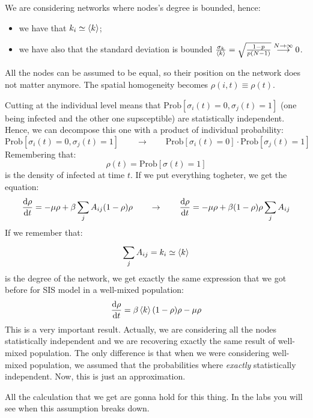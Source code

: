 \documentclass[../main/main.tex]{subfiles}
\begin{document}
We are considering networks where nodes's degree is bounded, hence:
\begin{itemize}
\item we have that \( k_i \simeq \expval{k}  \);
\item we have also that the standard deviation is bounded \( \frac{\sigma _k}{\expval{k} } = \sqrt{ \frac{1-p}{p(N-1)} } \overset{N \rightarrow \infty }{\longrightarrow} 0\).
\end{itemize}
All the nodes can be assumed to be equal, so their position on the network does not matter anymore. The spatial homogeneity becomes \( \rho (i,t) \equiv \rho (t) \).

Cutting at the individual level means that \( \text{Prob} [\sigma _i (t) = 0, \sigma _j (t ) =1 ] \) (one being infected and the other one supsceptible) are statistically independent. Hence, we can decompose this one with a product of individual probability:
\begin{equation*}
  \text{Prob} [\sigma _i (t) = 0, \sigma _j (t ) =1 ] \qquad \rightarrow \qquad \text{Prob} [\sigma _i (t) = 0] \cdot \text{Prob} [\sigma _j (t ) =1 ]
\end{equation*}
Remembering that:
\begin{equation*}
  \rho (t) = \text{Prob} [\sigma (t)=1]
\end{equation*}
is the density of infected at time \( t \).
If we put everything togheter, we get the equation:
\begin{equation*}
  \dv{\rho }{t} = - \mu \rho  + \beta \sum_{j}^{} A_{ij} (1- \rho ) \rho \qquad \rightarrow \qquad
   \dv{\rho }{t} = - \mu \rho  + \beta (1- \rho ) \rho \sum_{j}^{} A_{ij}
\end{equation*}
If we remember that:
\begin{equation}
  \sum_{j}^{} A_{ij} = k_i \simeq \expval{k}
\end{equation}
is the degree of the network, we get exactly the same expression that we got before for SIS model in a well-mixed population:
\begin{equation}
  \dv{\rho }{t} = \beta \expval{k} (1- \rho ) \rho - \mu \rho
\end{equation}
This is a very important result. Actually, we are considering all the nodes statistically independent and we are recovering exactly the same result of well-mixed population. The only difference is that when we were considering well-mixed population, we assumed that the probabilities where \emph{exactly} statistically independent. Now, this is just an approximation.

All the calculation that we get are gonna hold for this thing. In the labs you will see when this assumption breaks down.
\end{document}
